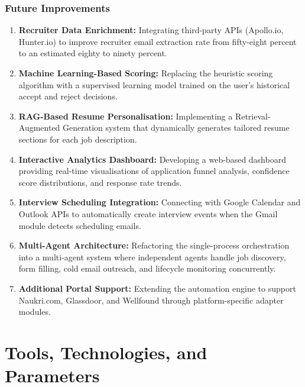 \documentclass[12pt, a4paper, oneside]{report}
\begin{document}
\subsection{Future Improvements}

\begin{enumerate}
    \item \textbf{Recruiter Data Enrichment:} Integrating third-party APIs (Apollo.io, Hunter.io) to improve recruiter email extraction rate from fifty-eight percent to an estimated eighty to ninety percent.

    \item \textbf{Machine Learning-Based Scoring:} Replacing the heuristic scoring algorithm with a supervised learning model trained on the user's historical accept and reject decisions.

    \item \textbf{RAG-Based Resume Personalisation:} Implementing a Retrieval-Augmented Generation system that dynamically generates tailored resume sections for each job description.

    \item \textbf{Interactive Analytics Dashboard:} Developing a web-based dashboard providing real-time visualisations of application funnel analysis, confidence score distributions, and response rate trends.

    \item \textbf{Interview Scheduling Integration:} Connecting with Google Calendar and Outlook APIs to automatically create interview events when the Gmail module detects scheduling emails.

    \item \textbf{Multi-Agent Architecture:} Refactoring the single-process orchestration into a multi-agent system where independent agents handle job discovery, form filling, cold email outreach, and lifecycle monitoring concurrently.

    \item \textbf{Additional Portal Support:} Extending the automation engine to support Naukri.com, Glassdoor, and Wellfound through platform-specific adapter modules.
\end{enumerate}


\chapter{Tools, Technologies, and Parameters}
\label{chap:tools}
\end{document}
